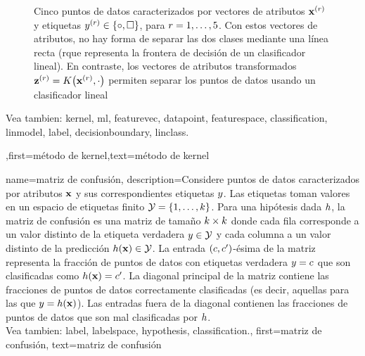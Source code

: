 {{\begin{figure}[H]
\begin{center}
\end{center}
\caption{
Cinco puntos de datos caracterizados por vectores de atributos ${\bf x}^{(r)}$ 
y etiquetas $y^{(r)} \in \{ \circ, \square \}$, para $r=1,\ldots,5$. 
Con estos vectores de atributos, no hay forma de separar las dos clases
mediante una línea recta (rque representa la frontera de decisión de un clasificador lineal). 
En contraste, los vectores de atributos transformados ${\bf z}^{(r)} = K\big({\bf x}^{(r)},\cdot\big)$ 
permiten separar los puntos de datos usando un clasificador lineal  \label{fig_linsep_kernel_dict}}
\end{figure}
Vea tambien: \gls{kernel}, \gls{ml}, \gls{featurevec}, \gls{datapoint}, \gls{featurespace}, \gls{classification}, \gls{linmodel}, \gls{label}, \gls{decisionboundary}, \gls{linclass}.
},first={método de kernel},text={método de kernel} }
	

{name={matriz de confusión}, 
description={Considere puntos de datos caracterizados 
	por atributos ${\bf x}$ y sus correspondientes etiquetas $y$. 
	Las etiquetas toman valores en un espacio de etiquetas finito $\mathcal{Y} = \{1, \ldots, k\}$. 
	Para una hipótesis dada $h$, la matriz de confusión es una 
	matriz de tamaño $k \times k$ donde cada fila corresponde a un valor 
	distinto de la etiqueta verdadera $y \in \mathcal{Y}$ y cada columna a un valor 
	distinto de la predicción $h({\bf x}) \in \mathcal{Y}$. 
	La entrada $(c,c')$-ésima de la matriz representa la fracción de 
	puntos de datos con etiquetas verdadera $y = c$ que son clasificadas como 
	$h({\bf x}) = c'$. La diagonal principal de la matriz contiene las fracciones 
	de puntos de datos correctamente clasificadas (es decir, aquellas para las que 
	$y = h({\bf x})$). Las entradas fuera de la diagonal contienen las fracciones de 
	puntos de datos que son mal clasificadas por $h$.
	\\
	Vea tambien: \gls{label}, \gls{labelspace}, \gls{hypothesis}, \gls{classification}.},
first={matriz de confusión},
text={matriz de confusión} 
}


